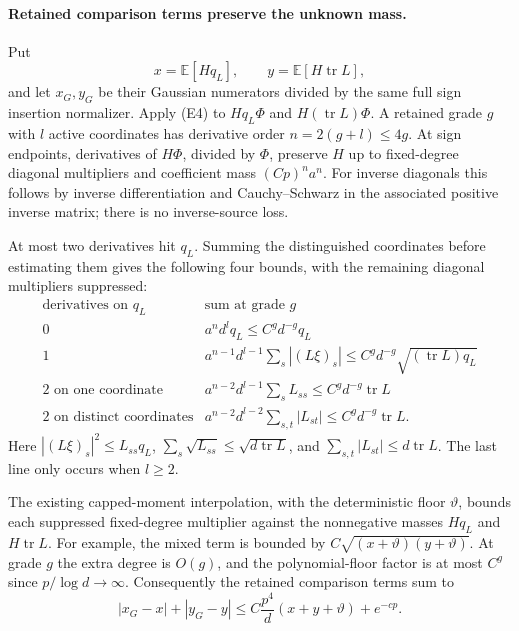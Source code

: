 \documentclass[10pt]{article}
\numberwithin{equation}{section}
\newcommand{\1}{\mathbf1}
\begin{document}
\paragraph{Retained comparison terms preserve the unknown mass.}
Put
\[
 x=\mathbb E[Hq_L],\qquad y=\mathbb E[H\operatorname{tr}L],
\]
and let $x_G,y_G$ be their Gaussian numerators divided by the same
full sign insertion normalizer.  Apply (E4) to $Hq_L\Phi$ and
$H(\operatorname{tr}L)\Phi$.  A retained grade $g$ with $l$ active
coordinates has derivative order $n=2(g+l)\le4g$.  At sign endpoints,
derivatives of $H\Phi$, divided by $\Phi$, preserve $H$ up to
fixed-degree diagonal multipliers and coefficient mass $(Cp)^n a^n$.
For inverse diagonals this follows by inverse differentiation and
Cauchy--Schwarz in the associated positive inverse matrix;
there is no inverse-source loss.

At most two derivatives hit $q_L$.  Summing the distinguished
coordinates before estimating them gives the following four bounds,
with the remaining diagonal multipliers suppressed:
\[
 \begin{array}{c|c}
 \text{derivatives on }q_L&\text{sum at grade }g\\ \hline
 0&a^n d^lq_L\le C^g d^{-g}q_L\\
 1&a^{n-1}d^{l-1}\sum_s|(L\xi)_s|
                  \le C^g d^{-g}\sqrt{(\operatorname{tr}L)q_L}\\
 2\text{ on one coordinate}
      &a^{n-2}d^{l-1}\sum_sL_{ss}
                  \le C^g d^{-g}\operatorname{tr}L\\
 2\text{ on distinct coordinates}
      &a^{n-2}d^{l-2}\sum_{s,t}|L_{st}|
                  \le C^g d^{-g}\operatorname{tr}L.
 \end{array}                                                     \tag{WT4}
\]
Here $|(L\xi)_s|^2\le L_{ss}q_L$,
$\sum_s\sqrt{L_{ss}}\le\sqrt{d\operatorname{tr}L}$, and
$\sum_{s,t}|L_{st}|\le d\operatorname{tr}L$.
The last line only occurs when $l\ge2$.

The existing capped-moment interpolation, with the deterministic floor
$\vartheta$, bounds each suppressed fixed-degree multiplier against
the nonnegative masses $Hq_L$ and $H\operatorname{tr}L$.  For example,
the mixed term is bounded by $C\sqrt{(x+\vartheta)(y+\vartheta)}$.
At grade $g$ the extra degree is $O(g)$, and the polynomial-floor
factor is at most $C^g$ since $p/\log d\to\infty$.
Consequently the retained comparison terms sum to
\[
 |x_G-x|+|y_G-y|
 \le C\frac{p^4}{d}(x+y+\vartheta)+e^{-cp}.                       \tag{WT5}
\]
\end{document}

